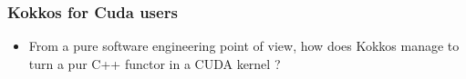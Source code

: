 \begin{frame}
  \frametitle{Kokkos for Cuda users}

  \begin{itemize}
  \item From a pure software engineering point of view, how does Kokkos manage to turn a pur C++ functor in a CUDA kernel ?
  \end{itemize}

\end{frame}
